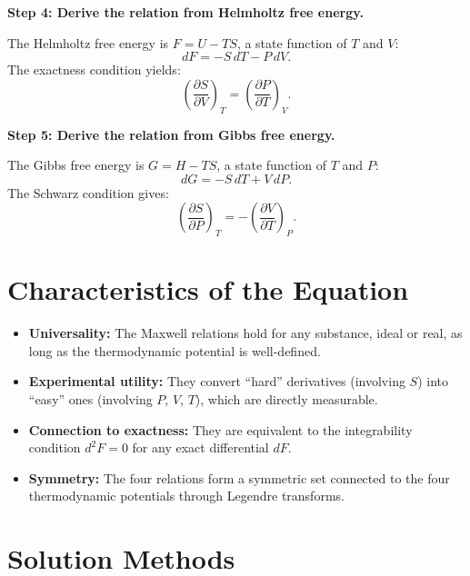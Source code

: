 \textbf{Step 4: Derive the relation from Helmholtz free energy.}

The Helmholtz free energy is $F = U - TS$, a state function of $T$ and $V$:
\begin{equation}
dF = -S\,dT - P\,dV.
\end{equation}
The exactness condition yields:
\begin{equation}
\left(\frac{\partial S}{\partial V}\right)_{T} = \left(\frac{\partial P}{\partial T}\right)_{V}.
\end{equation}

\textbf{Step 5: Derive the relation from Gibbs free energy.}

The Gibbs free energy is $G = H - TS$, a state function of $T$ and $P$:
\begin{equation}
dG = -S\,dT + V\,dP.
\end{equation}
The Schwarz condition gives:
\begin{equation}
\left(\frac{\partial S}{\partial P}\right)_{T} = -\left(\frac{\partial V}{\partial T}\right)_{P}.
\end{equation}

\section*{Characteristics of the Equation}

\begin{itemize}
  \item \textbf{Universality:} The Maxwell relations hold for any substance, ideal or real, as long as the thermodynamic potential is well-defined.
  \item \textbf{Experimental utility:} They convert ``hard'' derivatives (involving $S$) into ``easy'' ones (involving $P$, $V$, $T$), which are directly measurable.
  \item \textbf{Connection to exactness:} They are equivalent to the integrability condition $d^{2}F = 0$ for any exact differential $dF$.
  \item \textbf{Symmetry:} The four relations form a symmetric set connected to the four thermodynamic potentials through Legendre transforms.
\end{itemize}
\section*{Solution Methods}

